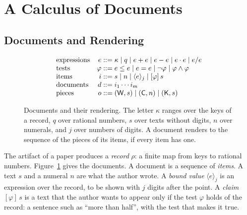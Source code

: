 \documentclass[acmsmall,nonacm,screen]{acmart}
\newcommand{\sem}[1]{[\![#1]\!]}
\newcommand{\evto}{\Downarrow}
\newcommand{\lW}{\mathsf{W}}
\newcommand{\lC}{\mathsf{C}}
\newcommand{\lK}{\mathsf{K}}
\newcommand{\bound}[2]{\langle #1 \rangle_{#2}}
\newcommand{\shw}[2]{\mathrm{show}_{#1}(#2)}
\begin{document}
\section{A Calculus of Documents}
\label{sec:calculus}

\subsection{Documents and Rendering}

\begin{figure}[t]
\[
\begin{array}{@{}l@{\quad}r@{\;}l@{}}
\text{expressions} & e ::= & \kappa \mid q \mid e + e \mid e - e \mid e \cdot e \mid e / e \\
\text{tests} & \varphi ::= & e \le e \mid e = e \mid \neg\varphi \mid \varphi \wedge \varphi \\
\text{items} & i ::= & s \mid n \mid \bound{e}{j} \mid [\varphi]\,s \\
\text{documents} & d ::= & i_1 \cdots i_m \\
\text{pieces} & o ::= & (\lW, s) \mid (\lC, n) \mid (\lK, s)
\end{array}
\]
\caption{Documents and their rendering. The letter $\kappa$ ranges over the keys of a record,
$q$ over rational numbers, $s$ over texts without digits, $n$ over numerals, and $j$ over
numbers of digits. A document renders to the sequence of the pieces of its items, if every
item has one.}
\label{fig:calculus}
\end{figure}

The artifact of a paper produces a \emph{record} $\rho$: a finite map from keys to rational
numbers. Figure~\ref{fig:calculus} gives the documents. A document is a sequence of
\emph{items}. A text $s$ and a numeral $n$ are what the author wrote. A \emph{bound value}
$\bound{e}{j}$ is an expression over the record, to be shown with $j$ digits after the point.
A \emph{claim} $[\varphi]\,s$ is a text that the author wants to appear only if the test
$\varphi$ holds of the record: a sentence such as ``more than half'', with the test that
makes it true.
\end{document}
